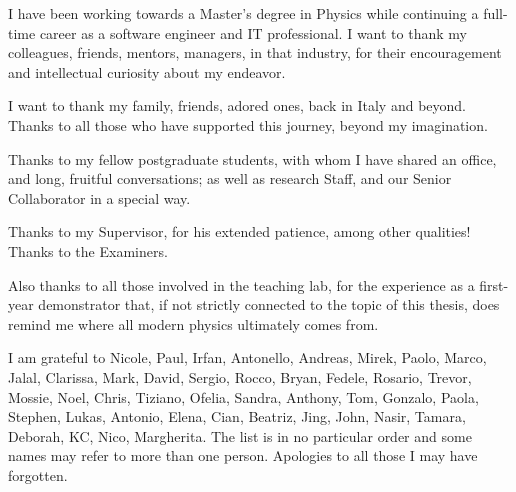 I have been working towards a Master's degree in Physics
while continuing a full-time career as a software engineer and IT professional.
I want to thank my colleagues, friends, mentors, managers, in that industry,
for their encouragement and intellectual curiosity about my endeavor.

I want to thank my family, friends, adored ones, back in Italy and beyond.
Thanks to all those who have supported this journey, beyond my imagination.

Thanks to my fellow postgraduate students, with whom I have shared
an office, and long, fruitful conversations;
as well as research Staff, and our Senior Collaborator in a special way.

Thanks to my Supervisor, for his extended patience, among other qualities!
Thanks to the Examiners.

Also thanks to all those involved in the teaching lab,
for the experience as a first-year demonstrator that,
if not strictly connected to the topic of this thesis,
does remind me where all modern physics ultimately comes from.

I am grateful to Nicole, Paul, Irfan, Antonello, Andreas, Mirek, Paolo, Marco,
Jalal, Clarissa, Mark, David, Sergio, Rocco, Bryan, Fedele, Rosario, Trevor, Mossie, Noel, Chris, Tiziano, Ofelia,
Sandra, Anthony, Tom, Gonzalo, Paola, Stephen, Lukas, Antonio, Elena, Cian, Beatriz, Jing, John, Nasir, Tamara,
Deborah, KC, Nico, Margherita. The list is in no particular order and some names may refer to more than one person.
Apologies to all those I may have forgotten.

